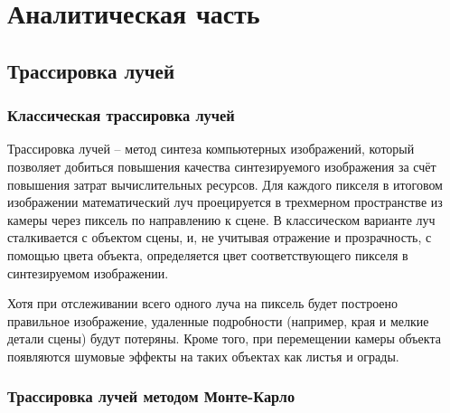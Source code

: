 \chapter{Аналитическая часть}

\section{Трассировка лучей}

\subsection{Классическая трассировка лучей}

 


Трассировка лучей -- метод синтеза компьютерных изображений, который позволяет добиться повышения качества синтезируемого изображения за счёт повышения затрат вычислительных ресурсов.
Для каждого пикселя в итоговом изображении математический луч проецируется в трехмерном пространстве из камеры через пиксель по направлению к сцене. В классическом варианте луч сталкивается с объектом сцены, и, не учитывая отражение и прозрачность, с помощью цвета объекта, определяется цвет соответствующего пикселя в синтезируемом изображении.

Хотя при отслеживании всего одного луча на пиксель будет построено правильное изображение, удаленные подробности (например, края и мелкие детали сцены) будут потеряны. Кроме того, при перемещении камеры объекта появляются шумовые эффекты на таких объектах как листья и ограды.

 
\subsection{Трассировка лучей методом Монте-Карло}

